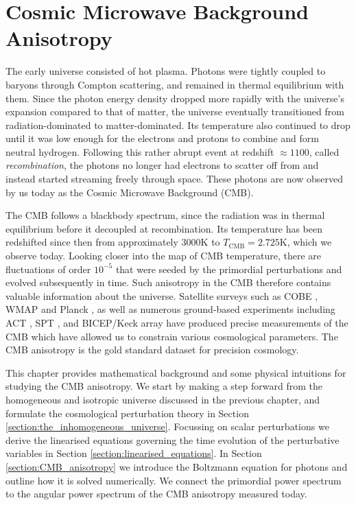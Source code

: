 
\chapter{Cosmic Microwave Background Anisotropy}

\ifpdf
    \graphicspath{{Chapter2/Figs/Raster/}{Chapter2/Figs/PDF/}{Chapter2/Figs/}}
\else
    \graphicspath{{Chapter2/Figs/Vector/}{Chapter2/Figs/}}
\fi

The early universe consisted of hot plasma. Photons were tightly coupled to baryons through Compton scattering, and remained in thermal equilibrium with them. Since the photon energy density dropped more rapidly with the universe's expansion compared to that of matter, the universe eventually transitioned from radiation-dominated to matter-dominated. Its temperature also continued to drop until it was low enough for the electrons and protons to combine and form neutral hydrogen. Following this rather abrupt event at redshift $\approx1100$, called \textit{recombination}, the photons no longer had electrons to scatter off from and instead started streaming freely through space. These photons are now observed by us today as the Cosmic Microwave Background (CMB).

The CMB follows a blackbody spectrum, since the radiation was in thermal equilibrium before it decoupled at recombination. Its temperature has been redshifted since then from approximately $3000$K to $T_\text{CMB}=2.725$K, which we observe today. Looking closer into the map of CMB temperature, there are fluctuations of order $10^{-5}$ that were seeded by the primordial perturbations and evolved subsequently in time. Such anisotropy in the CMB therefore contains valuable information about the universe.  Satellite surveys such as COBE \cite{Smoot1992cobe}, WMAP \cite{Spergel2003wmapfirst} and Planck \cite{PlanckCollaboration2013paramters}, as well as numerous ground-based experiments including ACT \cite{Dunkley2011act}, SPT \cite{Carlstrom2011spt}, and BICEP/Keck array \cite{Ade2016bicepkeck} have produced precise measurements of the CMB which have allowed us to constrain various cosmological parameters. The CMB anisotropy is the gold standard dataset for precision cosmology.

This chapter provides mathematical background and some physical intuitions for studying the CMB anisotropy. We start by making a step forward from the homogeneous and isotropic universe discussed in the previous chapter, and formulate the cosmological perturbation theory in Section \ref{section:the_inhomogeneous_universe}. Focussing on scalar perturbations we derive the linearised equations governing the time evolution of the perturbative variables in Section \ref{section:linearised_equations}. In Section \ref{section:CMB_anisotropy} we introduce the Boltzmann equation for photons and outline how it is solved numerically. We connect the primordial power spectrum to the angular power spectrum of the CMB anisotropy measured today.


